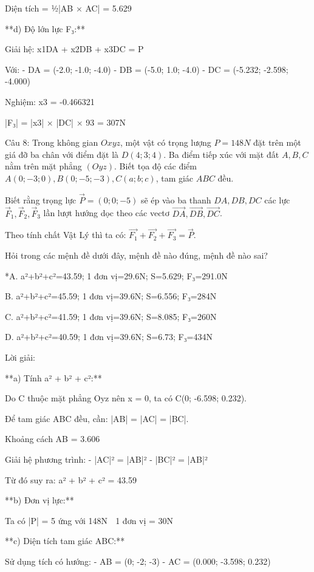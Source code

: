 \documentclass[a4paper,12pt]{article}
\begin{document}
Diện tích = ½|AB⃗ × AC⃗| = 5.629

**d) Độ lớn lực F₃:**

Giải hệ: x1DA⃗ + x2DB⃗ + x3DC⃗ = P⃗

Với:
- DA⃗ = (-2.0; -1.0; -4.0)
- DB⃗ = (-5.0; 1.0; -4.0)
- DC⃗ = (-5.232; -2.598; -4.000)

Nghiệm: x3 = -0.466321

|F₃| = |x3| × |DC⃗| × 93 = 307N




Câu 8: Trong không gian \(Oxyz\), một vật có trọng lượng \(P=148N\) đặt trên một giá đỡ ba chân với điểm đặt là \(D(4; 3; 4)\). Ba điểm tiếp xúc với mặt đất \(A, B, C\) nằm trên mặt phẳng \((Oyz)\). Biết tọa độ các điểm \(A(0; -3; 0), B(0; -5; -3), C(a; b; c)\), tam giác \(ABC\) đều. 

Biết rằng trọng lực \(\overrightarrow{P}=(0; 0; -5)\) sẽ ép vào ba thanh \(DA, DB, DC\) các lực \(\overrightarrow{F}_1, \overrightarrow{F}_2, \overrightarrow{F}_3\) lần lượt hướng dọc theo các vectơ \(\overrightarrow{DA}, \overrightarrow{DB}, \overrightarrow{DC}\). 

Theo tính chất Vật Lý thì ta có: \(\overrightarrow{F_1}+\overrightarrow{F_2}+\overrightarrow{F_3}=\overrightarrow{P}\).

Hỏi trong các mệnh đề dưới đây, mệnh đề nào đúng, mệnh đề nào sai?

*A. a²+b²+c²=43.59; 1 đơn vị=29.6N; S=5.629; F₃=291.0N

B. a²+b²+c²=45.59; 1 đơn vị=39.6N; S=6.556; F₃=284N

C. a²+b²+c²=41.59; 1 đơn vị=39.6N; S=8.085; F₃=260N

D. a²+b²+c²=40.59; 1 đơn vị=39.6N; S=6.73; F₃=434N

Lời giải:


**a) Tính a² + b² + c²:**

Do C thuộc mặt phẳng Oyz nên x = 0, ta có C(0; -6.598; 0.232).

Để tam giác ABC đều, cần: |AB| = |AC| = |BC|.

Khoảng cách AB = 3.606

Giải hệ phương trình:
- |AC|² = |AB|²  
- |BC|² = |AB|²

Từ đó suy ra: a² + b² + c² = 43.59

**b) Đơn vị lực:**

Ta có |P⃗| = 5 ứng với 148N
⟹ 1 đơn vị = 30N

**c) Diện tích tam giác ABC:**

Sử dụng tích có hướng:
- AB⃗ = (0; -2; -3)
- AC⃗ = (0.000; -3.598; 0.232)
\end{document}

